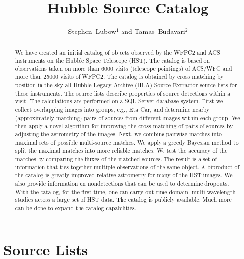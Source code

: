 
\resetcounters




\title{Hubble Source Catalog}
\author{Stephen~Lubow$^1$ and Tamas~Budavari$^2$
}


\begin{abstract}
We have created an initial catalog of objects observed by the WFPC2 and ACS instruments on the Hubble Space Telescope (HST). The catalog is based on observations taken on more than 6000 visits (telescope pointings) of ACS/WFC and more than 25000 visits of WFPC2. The catalog is obtained by cross matching by position in the sky all Hubble Legacy Archive (HLA) Source Extractor source lists for these instruments. The source lists describe properties of source detections within a visit. The calculations are performed on a SQL Server database system. First we collect overlapping images into groups, e.g., Eta Car, and determine nearby (approximately matching) pairs of sources from different images within each group. We then apply a novel algorithm for improving the cross matching of pairs of sources by adjusting the astrometry of the images. Next, we combine pairwise matches into maximal sets of possible multi-source matches. 
We apply a greedy Bayesian method to split the maximal matches into more reliable matches. We test the accuracy of the matches by comparing the fluxes of the matched sources. The result is a set of information that ties together multiple observations of the same object. A biproduct of the catalog is greatly improved relative astrometry for many of the HST images. We also provide information on nondetections that can be used to determine dropouts. With the catalog, for the first time, one can carry out time domain, multi-wavelength studies across a large set of HST data. The catalog is publicly available. Much more can be done to expand the catalog capabilities.

\end{abstract}

\section{Source Lists}

